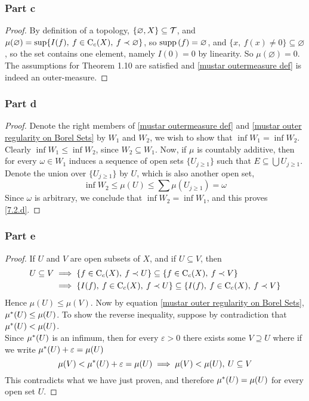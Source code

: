 \documentclass[../../main.tex]{subfiles}
\begin{document}
\subsubsection*{Part c}
\begin{proof}
    By definition of a topology, $\{\varnothing, X\}\subseteq \mathcal{T}$, and $\mu(\varnothing) = \sup\{I(f),\: f\in\operatorname{C}_c({X}),\:f\prec \varnothing\}$, so $\operatorname{supp}{(f)}=\varnothing$, and $\{x,\:f(x)\neq 0\}\subseteq\varnothing$, so the set contains one element, namely $I(0)=0$ by linearity. So $\mu(\varnothing)=0$. The assumptions for Theorem 1.10 are satisfied and \eqref{mustar outermeasure def} is indeed an outer-measure.
\end{proof}

\subsubsection*{Part d}
\begin{proof}
    Denote the right members of \eqref{mustar outermeasure def} and \eqref{mustar outer regularity on Borel Sets} by $W_1$ and $W_2$, we wish to show that $\inf{W_1} = \inf{W_2}$. Clearly $\inf{W_1}\leq \inf{W_2}$, since $W_2\subseteq W_1$. Now, if $\mu$ is countably additive, then for every $\omega\in W_1$ induces a sequence of open sets $\{U_{j\geq 1}\}$ such that $E\subseteq \bigcup U_{j\geq 1}$. Denote the union over $\{U_{j\geq 1}\}$ by $U$, which is also another open set, 
    \[
    \inf{W_2}\leq\mu(U)\leq \sum \mu(U_{j\geq 1})=\omega
    \]
    Since $\omega$ is arbitrary, we conclude that $\inf{W_2}=\inf{W_1}$, and this proves \ref{7.2.d}.
\end{proof}
\subsubsection*{Part e}
\begin{proof}
    If $U$ and $V$ are open subsets of $X$, and if $U\subseteq V$, then
    \begin{align*}
        U\subseteq V &\implies\left\{f\in\operatorname{C}_c({X}),\:f\prec U\right\}\subseteq\left\{f\in\operatorname{C}_c({X}),\:f\prec V\right\} \\
        &\implies \left\{I(f),\:f\in\operatorname{C}_c({X}),\:f\prec U\right\}\subseteq\left\{I(f),\:f\in\operatorname{C}_c({X}),\:f\prec V\right\}
    \end{align*}
    Hence $\mu(U)\leq \mu(V)$. Now by equation \eqref{mustar outer regularity on Borel Sets}, $\mu^*(U)\leq \mu(U)$. To show the reverse inequality, suppose by contradiction that $\mu^*(U)<\mu(U)$.\\
    
    Since $\mu^*(U)$ is an infimum, then for every $\varepsilon>0$ there exists some $V\supseteq U$ where if we write $\mu^*(U)+\varepsilon=\mu(U)$
    \[
    \mu(V)<\mu^*(U)+\varepsilon=\mu(U)\implies \mu(V)<\mu(U),\:U\subseteq V
    \]
    This contradicts what we have just proven, and therefore $\mu^*(U)=\mu(U)$ for every open set $U$.
\end{proof}
\end{document}
